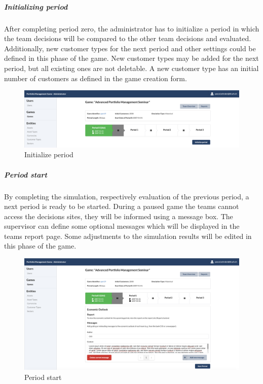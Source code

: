 \subparagraph{Initializing period}
After completing period zero, the administrator has to initialize a period in which the team decisions will be compared to the other team decisions and evaluated. Additionally, new customer types for the next period and other settings could be defined in this phase of the game. New customer types may be added for the next period, but all existing ones are not deletable. A new customer type has an initial number of customers as defined in the game creation form.
\begin{figure}[h!]
  \centering
  \includegraphics[scale=0.2]{img/application-overview/administrator/08_period_initialization.png}
  \caption{Initialize period}
\end{figure}


\subparagraph{Period start}
By completing the simulation, respectively evaluation of the previous period, a next period is ready to be started. During a paused game the teams cannot access the decisions sites, they will be informed using a message box. The supervisor can define some optional messages which will be displayed in the teams report page. Some adjustments to the simulation results will be edited in this phase of the game.
\begin{figure}[h!]
  \centering
  \includegraphics[scale=0.2]{img/application-overview/administrator/09_period_start.png}
  \caption{Period start}
\end{figure}

